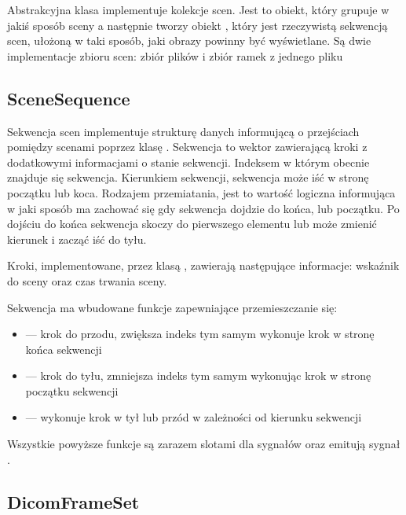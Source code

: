 \label{sec:sokar-scenesets}

Abstrakcyjna klasa  implementuje kolekcje scen.
Jest to obiekt, który grupuje w jakiś sposób sceny a następnie tworzy obiekt , który jest rzeczywistą sekwencją scen, ułożoną w taki sposób, jaki obrazy powinny być wyświetlane.
Są dwie implementacje zbioru scen: zbiór plików i zbiór ramek z jednego pliku

\subsection{SceneSequence}

\par
Sekwencja scen implementuje strukturę danych informującą o przejściach pomiędzy scenami poprzez klasę .
Sekwencja to wektor zawierającą kroki z dodatkowymi informacjami o stanie sekwencji.
Indeksem w którym obecnie znajduje się sekwencja.
Kierunkiem sekwencji, sekwencja może iść w stronę początku lub koca.
Rodzajem przemiatania, jest to wartość logiczna informująca w jaki sposób ma zachować się gdy sekwencja dojdzie do końca, lub początku.
Po dojściu do końca sekwencja skoczy do pierwszego elementu lub może zmienić kierunek i zacząć iść do tyłu.

\par
Kroki, implementowane, przez klasą , zawierają następujące informacje: wskaźnik do sceny oraz czas trwania sceny.

\par
Sekwencja ma wbudowane funkcje zapewniające przemieszczanie się:
\begin{itemize}
    \item {} --- krok do przodu, zwiększa indeks tym samym wykonuje krok w stronę końca sekwencji
    \item {} --- krok do tyłu, zmniejsza indeks tym samym wykonując krok w stronę początku sekwencji
    \item {} --- wykonuje krok w tył lub przód w zależności od kierunku sekwencji
\end{itemize}
Wszystkie powyższe funkcje są zarazem slotami dla sygnałów oraz emitują sygnał .

\subsection{DicomFrameSet}

